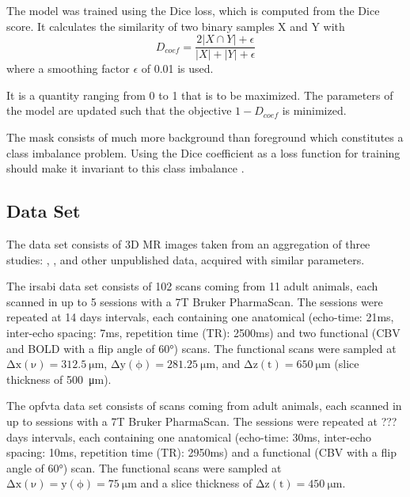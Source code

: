 The model was trained using the Dice loss, which is computed from the Dice score.
It calculates the similarity of two binary samples X and Y with
\begin{equation}\label{eqDcoef}
D_{coef} = \frac {2|X\cap Y| + \epsilon}{|X|+|Y| + \epsilon}
\end{equation}
where a smoothing factor $\epsilon$ of 0.01 is used.

It is a quantity ranging from 0 to 1 that is to be maximized.
The parameters of the model are updated such that the objective $1-D_{coef}$ is minimized.

The mask consists of much more background than foreground which constitutes a class imbalance problem.
Using the Dice coefficient as a loss function for training should make it invariant to this class imbalance \citep{milletari_v-net:_2016}.

\subsection{Data Set} \label{subsec:Data Set}
The data set consists of 3D MR images taken from an aggregation of three studies: \citep[irsabi]{irsabi_bidsdata}, \citep[opfvta]{ioanas_whole-brain_nodate}, \citep[drlfom]{ioanas_effects_nodate} and other unpublished data, acquired with similar parameters.

The irsabi data set consists of 102 scans coming from 11 adult animals, each scanned in up to 5 sessions with a 7T Bruker PharmaScan.
The sessions were repeated at 14 days intervals, each containing one anatomical (echo-time: 21ms, inter-echo spacing: 7ms, repetition time (TR): 2500ms) and two functional (CBV and BOLD with a flip angle of 60°) scans.
The functional scans were sampled at $\mathrm{\Delta x(\nu)=\SI{312.5}{\micro\meter}}$, $\mathrm{\Delta y(\phi)=\SI{281.25}{\micro\meter}}$, and $\mathrm{\Delta z(t)=\SI{650}{\micro\meter}}$ (slice thickness of \SI{500}{\micro\meter}).

The opfvta data set consists of  scans coming from  adult animals, each scanned in up to  sessions with a 7T Bruker PharmaScan.
The sessions were repeated at ??? days intervals, each containing one anatomical (echo-time: 30ms, inter-echo spacing: 10ms, repetition time (TR): 2950ms) and a functional (CBV with a flip angle of 60°) scan.
The functional scans were sampled at $\mathrm{\Delta x(\nu)=y(\phi)=\SI{75}{\micro\meter}}$ and a slice thickness of $\mathrm{\Delta z(t)=\SI{450}{\micro\meter}}$.

